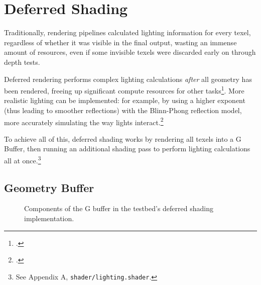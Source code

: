 \documentclass[11pt, oneside]{report}
\begin{document}
\chapter{Deferred Shading}
Traditionally, rendering pipelines calculated lighting information for every \gls{texel}, regardless of whether it was visible in the final output, wasting an immense amount of resources, even if some invisible \glspl{texel} were discarded early on through \glspl{depth test}.

Deferred rendering performs complex lighting calculations \textit{after} all geometry has been rendered, freeing up significant compute resources for other tasks\footcite{gpupro-deferred}. More realistic lighting can be implemented: for example, by using a higher exponent (thus leading to smoother reflections) with the \gls{Blinn-Phong reflection model}, more accurately simulating the way lights interact.\footcite{ferko-deferred}

To achieve all of this, deferred shading works by rendering all texels into a \gls{G Buffer}, then running an additional shading pass to perform lighting calculations all at once.\footnote{See Appendix A, \texttt{shader/lighting.shader}.}

\section{Geometry Buffer}
\begin{figure}[!htbp]
  \centering
  \hfill
  \hfill
  \caption{Components of the G buffer in the testbed's deferred shading implementation.}
\end{figure}
\end{document}
